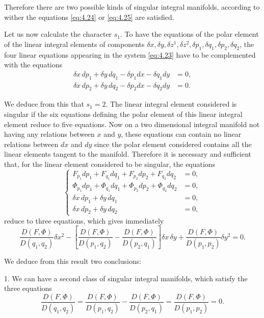 Therefore there are two possible kinds of singular integral manifolds, according to wither the equations \eqref{eq:4.24} or \eqref{eq:4.25} are satisfied.

Let us now calculate the character $s_{1}$. To have the equations of the polar element of the linear integral elements of components $\delta x,\delta y, \delta z^{1},\delta z^{2},\delta p_{1},\delta q_{1}, \delta p_{2}, \delta q_{2}$, the four linear equations appearing in the system \eqref{eq:4.23} have to be complemented with the equations
\begin{align*}
  \delta x\,dp_{1}+\delta y\,dq_{1}-\delta p_{1}dx-\delta q_{1}dy&=0,\\
  \delta x\,dp_{2}+\delta y\,dq_{2}-\delta p_{2}dx-\delta q_{2}dy&=0.
\end{align*}

We deduce from this that $s_{1}=2$. The linear integral element considered is singular if the six equations defining the polar element of this linear integral element reduce to five equations. Now on a two dimensional integral manifold not having any relations between $x$ and $y$, these equations can contain no linear relations between $dx$ and $dy$ since the polar element considered contains all the linear elements tangent to the manifold. Therefore it is necessary and sufficient that, for the linear element considered to be singular, the equations
\begin{equation}
  \label{eq:4.26}
  \left\{
    \begin{aligned}
      F_{p_{1}}dp_{1}+F_{q_{1}}dq_{1}+F_{p_{2}}dp_{2}+F_{q_{2}}dq_{2}&=0,\\
      \Phi_{p_{1}}dp_{1}+\Phi_{q_{1}}dq_{1}+\Phi_{p_{2}}dp_{2}+\Phi_{q_{2}}dq_{2}&=0,\\
      \delta x\,dp_{1}+\delta y\,dq_{1}&=0,\\
      \delta x\,dp_{2}+\delta y\,dq_{2}&=0,
    \end{aligned}
\right.
\end{equation}
reduce to three equations, which gives immediately
\begin{equation}
  \label{eq:4.27}
  \frac{D(F,\Phi)}{D(q_{1},q_{2})}\delta x^{2}-\left[\frac{D(F,\Phi)}{D(p_{1},q_{2})}-\frac{D(F,\Phi)}{D(p_{2},q_{1})}\right]\delta x\,\delta y+\frac{D(F,\Phi)}{D(p_{1},p_{2})}\delta y^{2}=0.
\end{equation}

We deduce from this result two conclusions:

1. We can have a second class of singular integral manifolds, which satisfy the three equations
\begin{equation}
  \label{eq:4.28}
  \frac{D(F,\Phi)}{D(q_{1},q_{2})}=\frac{D(F,\Phi)}{D(p_{1},q_{2})}-\frac{D(F,\Phi)}{D(p_{2},q_{1})}=\frac{D(F,\Phi)}{D(p_{1},p_{2})}=0.
\end{equation}


